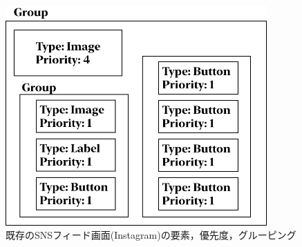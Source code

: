 \begin{figure}[htbp]
  \begin{minipage}{\hsize}
    \begin{center}
       \includegraphics[width=100mm]{img/Instagram_ViewStructure.png}
    \end{center}
    \caption{既存のSNSフィード画面(Instagram)の要素，優先度，グルーピング}
    \label{fig:instagram_ViewStructure}
  \end{minipage}
\end{figure}

